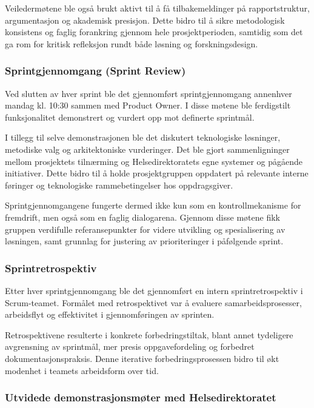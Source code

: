 Veiledermøtene ble også brukt aktivt til å få tilbakemeldinger på rapportstruktur, argumentasjon og akademisk presisjon. Dette bidro til å sikre metodologisk konsistens og faglig forankring gjennom hele prosjektperioden, samtidig som det ga rom for kritisk refleksjon rundt både løsning og forskningsdesign.

\subsubsection*{Sprintgjennomgang (Sprint Review)}

Ved slutten av hver sprint ble det gjennomført sprintgjennomgang annenhver mandag kl. 10:30 sammen med Product Owner. I disse møtene ble ferdigstilt funksjonalitet demonstrert og vurdert opp mot definerte sprintmål.

I tillegg til selve demonstrasjonen ble det diskutert teknologiske løsninger, metodiske valg og arkitektoniske vurderinger. Det ble gjort sammenligninger mellom prosjektets tilnærming og Helsedirektoratets egne systemer og pågående initiativer. Dette bidro til å holde prosjektgruppen oppdatert på relevante interne føringer og teknologiske rammebetingelser hos oppdragsgiver.

Sprintgjennomgangene fungerte dermed ikke kun som en kontrollmekanisme for fremdrift, men også som en faglig dialogarena. Gjennom disse møtene fikk gruppen verdifulle referansepunkter for videre utvikling og spesialisering av løsningen, samt grunnlag for justering av prioriteringer i påfølgende sprint.

\subsubsection*{Sprintretrospektiv}

Etter hver sprintgjennomgang ble det gjennomført en intern sprintretrospektiv i Scrum-teamet. Formålet med retrospektivet var å evaluere samarbeidsprosesser, arbeidsflyt og effektivitet i gjennomføringen av sprinten.

Retrospektivene resulterte i konkrete forbedringstiltak, blant annet tydeligere avgrensning av sprintmål, mer presis oppgavefordeling og forbedret dokumentasjonspraksis. Denne iterative forbedringsprosessen bidro til økt modenhet i teamets arbeidsform over tid.

\subsubsection*{Utvidede demonstrasjonsmøter med Helsedirektoratet}

